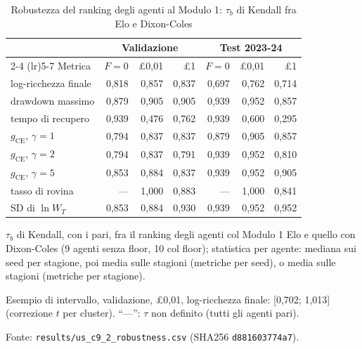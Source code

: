 \begin{table}[htbp]
\centering
\small
\caption{Robustezza del ranking degli agenti al Modulo 1: $\tau_b$ di Kendall fra Elo e Dixon-Coles}
\label{tab:ranking}
\begin{tabular}{lrrrrrr}
\toprule
 & \multicolumn{3}{c}{Validazione} & \multicolumn{3}{c}{Test 2023-24} \\
\cmidrule(lr){2-4} \cmidrule(lr){5-7}
Metrica & $F = 0$ & \pounds{}0,01 & \pounds{}1 & $F = 0$ & \pounds{}0,01 & \pounds{}1 \\
\midrule
log-ricchezza finale & 0,818 & 0,857 & 0,837 & 0,697 & 0,762 & 0,714 \\
drawdown massimo & 0,879 & 0,905 & 0,905 & 0,939 & 0,952 & 0,857 \\
tempo di recupero & 0,939 & 0,476 & 0,762 & 0,939 & 0,600 & 0,295 \\
$g_{\mathrm{CE}}$, $\gamma = 1$ & 0,794 & 0,837 & 0,837 & 0,879 & 0,905 & 0,857 \\
$g_{\mathrm{CE}}$, $\gamma = 2$ & 0,794 & 0,837 & 0,791 & 0,939 & 0,952 & 0,810 \\
$g_{\mathrm{CE}}$, $\gamma = 5$ & 0,853 & 0,884 & 0,837 & 0,939 & 0,952 & 0,905 \\
tasso di rovina & --- & 1,000 & 0,883 & --- & 1,000 & 0,841 \\
SD di $\ln W_T$ & 0,853 & 0,884 & 0,930 & 0,939 & 0,952 & 0,952 \\
\bottomrule
\end{tabular}

\smallskip
\begin{minipage}{\linewidth}
\footnotesize
$\tau_b$ di Kendall, con i pari, fra il ranking degli agenti col Modulo 1 Elo e quello con Dixon-Coles (9 agenti senza floor, 10 col floor); statistica per agente: mediana sui seed per stagione, poi media sulle stagioni (metriche per seed), o media sulle stagioni (metriche per stagione).\par
Esempio di intervallo, validazione, \pounds{}0,01, log-ricchezza finale: [0,702; 1,013] (correzione $t$ per cluster). ``---'': $\tau$ non definito (tutti gli agenti pari).\par
Fonte: \texttt{results/us\_c9\_2\_robustness.csv} (SHA256 \texttt{d881603774a7}).
\end{minipage}
\end{table}
